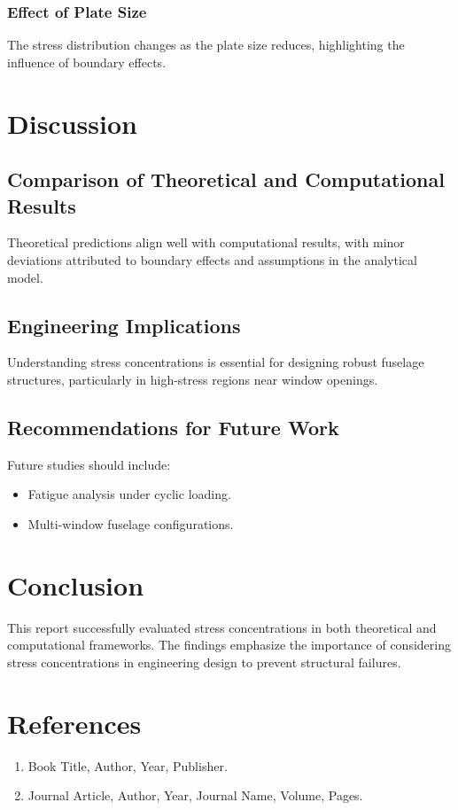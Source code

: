 \documentclass[a4paper,11pt]{article}
\begin{document}
\subsubsection{Effect of Plate Size}
The stress distribution changes as the plate size reduces, highlighting the influence of boundary effects.

\newpage

\section{Discussion}
\subsection{Comparison of Theoretical and Computational Results}
Theoretical predictions align well with computational results, with minor deviations attributed to boundary effects and assumptions in the analytical model.

\subsection{Engineering Implications}
Understanding stress concentrations is essential for designing robust fuselage structures, particularly in high-stress regions near window openings.

\subsection{Recommendations for Future Work}
Future studies should include:
\begin{itemize}
    \item Fatigue analysis under cyclic loading.
    \item Multi-window fuselage configurations.
\end{itemize}

\newpage

\section{Conclusion}
This report successfully evaluated stress concentrations in both theoretical and computational frameworks. The findings emphasize the importance of considering stress concentrations in engineering design to prevent structural failures.

\newpage

\section*{References}
\begin{enumerate}
    \item Book Title, Author, Year, Publisher.
    \item Journal Article, Author, Year, Journal Name, Volume, Pages.
\end{enumerate}
\end{document}
